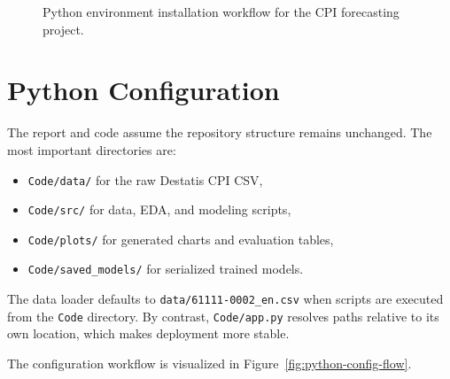 \begin{figure}[htbp]
	\centering
	\caption{Python environment installation workflow for the CPI forecasting project.}
	\label{fig:python-install-flow}
\end{figure}

\section{Python Configuration}

The report and code assume the repository structure remains unchanged. The most important directories are:

\begin{itemize}
	\item \texttt{Code/data/} for the raw Destatis CPI CSV,
	\item \texttt{Code/src/} for data, EDA, and modeling scripts,
	\item \texttt{Code/plots/} for generated charts and evaluation tables,
	\item \texttt{Code/saved\_models/} for serialized trained models.
\end{itemize}

The data loader defaults to \texttt{data/61111-0002\_en.csv} when scripts are executed from the \texttt{Code} directory. By contrast, \texttt{Code/app.py} resolves paths relative to its own location, which makes deployment more stable.

The configuration workflow is visualized in Figure~\ref{fig:python-config-flow}.

